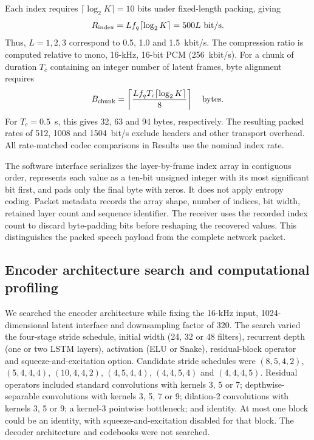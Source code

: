 \documentclass[final,5p,times,twocolumn]{elsarticle}
\begin{document}
Each index requires $\lceil\log_2K\rceil=10$ bits under fixed-length packing, giving
\begin{equation}
 R_{\rm index}=Lf_q\lceil\log_2K\rceil=500L\ {\rm bit/s}.
\end{equation}
Thus, $L=1,2,3$ correspond to 0.5, 1.0 and 1.5~kbit/s. The compression ratio is computed relative to mono, 16-kHz, 16-bit PCM (256~kbit/s). For a chunk of duration $T_c$ containing an integer number of latent frames, byte alignment requires
\begin{equation}
 B_{\rm chunk}=\left\lceil
 \frac{Lf_qT_c\lceil\log_2K\rceil}{8}
 \right\rceil\quad\text{bytes}.
\end{equation}
For $T_c=0.5$~s, this gives 32, 63 and 94 bytes, respectively. The resulting packed rates of 512, 1008 and 1504~bit/s exclude headers and other transport overhead. All rate-matched codec comparisons in Results use the nominal index rate.

The software interface serializes the layer-by-frame index array in contiguous order, represents each value as a ten-bit unsigned integer with its most significant bit first, and pads only the final byte with zeros. It does not apply entropy coding. Packet metadata records the array shape, number of indices, bit width, retained layer count and sequence identifier. The receiver uses the recorded index count to discard byte-padding bits before reshaping the recovered values. This distinguishes the packed speech payload from the complete network packet.

\subsection{Encoder architecture search and computational profiling}
We searched the encoder architecture while fixing the 16-kHz input, 1024-dimensional latent interface and downsampling factor of 320. The search varied the four-stage stride schedule, initial width (24, 32 or 48 filters), recurrent depth (one or two LSTM layers), activation (ELU or Snake), residual-block operator and squeeze-and-excitation option. Candidate stride schedules were $(8,5,4,2)$, $(5,4,4,4)$, $(10,4,4,2)$, $(4,5,4,4)$, $(4,4,5,4)$ and $(4,4,4,5)$. Residual operators included standard convolutions with kernels 3, 5 or 7; depthwise-separable convolutions with kernels 3, 5, 7 or 9; dilation-2 convolutions with kernels 3, 5 or 9; a kernel-3 pointwise bottleneck; and identity. At most one block could be an identity, with squeeze-and-excitation disabled for that block. The decoder architecture and codebooks were not searched.
\end{document}

